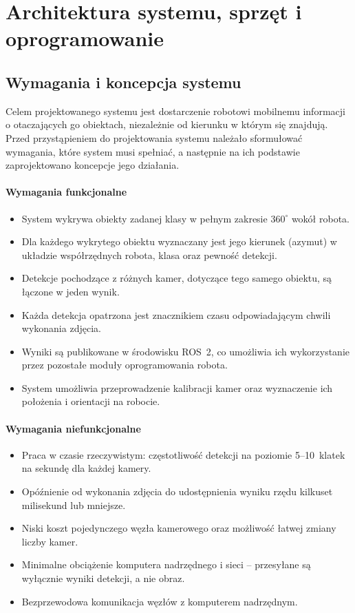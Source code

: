 \chapter{Architektura systemu, sprzęt i oprogramowanie}
\label{chap:architektura}

\section{Wymagania i koncepcja systemu}
\label{sec:wymagania}

Celem projektowanego systemu jest dostarczenie robotowi mobilnemu informacji o otaczających go obiektach, niezależnie od kierunku w którym się znajdują. Przed przystąpieniem do projektowania systemu należało sformułować wymagania, które system musi spełniać, a następnie na ich podstawie zaprojektowano koncepcje jego działania.
\subsubsection*{Wymagania funkcjonalne}

\begin{itemize}[nosep]
  \item System wykrywa obiekty zadanej klasy w pełnym zakresie
        $360^\circ$ wokół robota.
  \item Dla każdego wykrytego obiektu wyznaczany jest jego kierunek
        (azymut) w układzie współrzędnych robota, klasa oraz pewność detekcji.
  \item Detekcje pochodzące z różnych kamer, dotyczące tego samego obiektu,
        są łączone w jeden wynik.
  \item Każda detekcja opatrzona jest znacznikiem czasu odpowiadającym
        chwili wykonania zdjęcia.
  \item Wyniki są publikowane w środowisku ROS~2, co umożliwia ich
        wykorzystanie przez pozostałe moduły oprogramowania robota.
  \item System umożliwia przeprowadzenie kalibracji kamer oraz wyznaczenie
        ich położenia i orientacji na robocie.
\end{itemize}

\subsubsection*{Wymagania niefunkcjonalne}

\begin{itemize}
  \item Praca w czasie rzeczywistym: częstotliwość detekcji na poziomie
        5--10~klatek na sekundę dla każdej kamery.
  \item Opóźnienie od wykonania zdjęcia do udostępnienia wyniku rzędu
        kilkuset milisekund lub mniejsze.
  \item Niski koszt pojedynczego węzła kamerowego oraz możliwość łatwej
        zmiany liczby kamer.
  \item Minimalne obciążenie komputera nadrzędnego i sieci -- przesyłane
        są wyłącznie wyniki detekcji, a nie obraz.
  \item Bezprzewodowa komunikacja węzłów z komputerem nadrzędnym.
\end{itemize}

